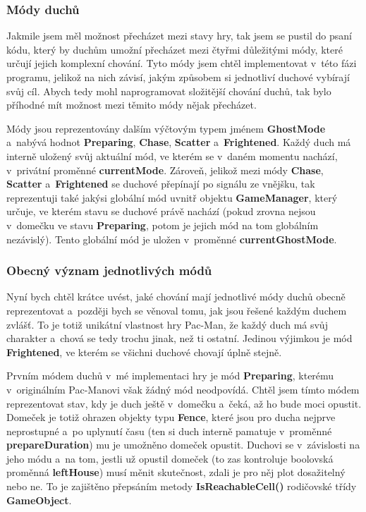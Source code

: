 \documentclass[a4]{article}
\begin{document}
\subsubsection{Módy duchů} \label{generalmodes}
Jakmile jsem měl možnost přecházet mezi stavy hry, tak jsem se pustil do psaní kódu, který by duchům umožní přecházet mezi čtyřmi důležitými módy, které určují jejich komplexní chování. Tyto módy jsem chtěl implementovat v~této fázi programu, jelikož na nich závisí, jakým způsobem si jednotliví duchové vybírají svůj cíl. Abych tedy mohl naprogramovat složitější chování duchů, tak bylo příhodné mít možnost mezi těmito módy nějak přecházet.

Módy jsou reprezentovány dalším výčtovým typem jménem \textbf{GhostMode} a~nabývá hodnot \textbf{Preparing}, \textbf{Chase}, \textbf{Scatter} a~\textbf{Frightened}. Každý duch má interně uložený svůj aktuální mód, ve kterém se v~daném momentu nachází, v~privátní proměnné \textbf{currentMode}. Zároveň, jelikož mezi módy \textbf{Chase}, \textbf{Scatter} a~\textbf{Frightened} se duchové přepínají po signálu ze vnějšku, tak reprezentuji také jakýsi globální mód uvnitř objektu \textbf{GameManager}, který určuje, ve kterém stavu se duchové právě nachází (pokud zrovna nejsou v~domečku ve stavu \textbf{Preparing}, potom je jejich mód na tom globálním nezávislý). Tento globální mód je uložen v~proměnné \textbf{currentGhostMode}.

\subsubsection{Obecný význam jednotlivých módů} \label{modemeaning}
Nyní bych chtěl krátce uvést, jaké chování mají jednotlivé módy duchů obecně reprezentovat a~později bych se věnoval tomu, jak jsou řešené každým duchem zvlášť. To je totiž unikátní vlastnost hry Pac-Man, že každý duch má svůj charakter a~chová se tedy trochu jinak, než ti ostatní. Jedinou výjimkou je mód \textbf{Frightened}, ve kterém se všichni duchové chovají úplně stejně.

Prvním módem duchů v~mé implementaci hry je mód \textbf{Preparing}, kterému v~originálním Pac-Manovi však žádný mód neodpovídá. Chtěl jsem tímto módem reprezentovat stav, kdy je duch ještě v~domečku a~čeká, až ho bude moci opustit. Domeček je totiž ohrazen objekty typu \textbf{Fence}, které jsou pro ducha nejprve neprostupné a~po uplynutí času (ten si duch interně pamatuje v~proměnné \textbf{prepareDuration}) mu je umožněno domeček opustit. Duchovi se v~závislosti na jeho módu a~na tom, jestli už opustil domeček (to zas kontroluje boolovská proměnná \textbf{leftHouse}) musí měnit skutečnost, zdali je pro něj plot dosažitelný nebo ne. To je zajištěno přepsáním metody \textbf{IsReachableCell()} rodičovské třídy \textbf{GameObject}.
\end{document}
